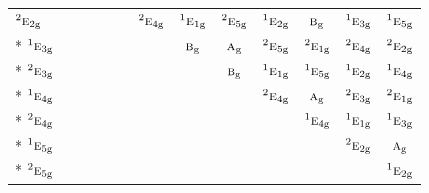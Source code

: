 \documentclass[10pt,a4paper]{article}
\numberwithin{equation}{section}
\newcommand{\irr}[1]{\text{\normalfont\scshape #1}}
\newcommand{\conjpair}[1]{{}^{#1}}
\newcommand{\ptag}[1]{\mathrm{#1}}
\begin{document}
{\begin{longtable}{@{}lcccccccccccc@{}}
$\conjpair{2}\irr{e}_{2\ptag{g}}$ &  &  &  &  &  & $\conjpair{2}\irr{e}_{4\ptag{g}}$ & $\conjpair{1}\irr{e}_{1\ptag{g}}$ & $\conjpair{2}\irr{e}_{5\ptag{g}}$ & $\conjpair{1}\irr{e}_{2\ptag{g}}$ & $\irr{b}_{\ptag{g}}$ & $\conjpair{1}\irr{e}_{3\ptag{g}}$ & $\conjpair{1}\irr{e}_{5\ptag{g}}$\\*
$\conjpair{1}\irr{e}_{3\ptag{g}}$ &  &  &  &  &  &  & $\irr{b}_{\ptag{g}}$ & $\irr{a}_{\ptag{g}}$ & $\conjpair{2}\irr{e}_{5\ptag{g}}$ & $\conjpair{2}\irr{e}_{1\ptag{g}}$ & $\conjpair{2}\irr{e}_{4\ptag{g}}$ & $\conjpair{2}\irr{e}_{2\ptag{g}}$\\*
$\conjpair{2}\irr{e}_{3\ptag{g}}$ &  &  &  &  &  &  &  & $\irr{b}_{\ptag{g}}$ & $\conjpair{1}\irr{e}_{1\ptag{g}}$ & $\conjpair{1}\irr{e}_{5\ptag{g}}$ & $\conjpair{1}\irr{e}_{2\ptag{g}}$ & $\conjpair{1}\irr{e}_{4\ptag{g}}$\\*
$\conjpair{1}\irr{e}_{4\ptag{g}}$ &  &  &  &  &  &  &  &  & $\conjpair{2}\irr{e}_{4\ptag{g}}$ & $\irr{a}_{\ptag{g}}$ & $\conjpair{2}\irr{e}_{3\ptag{g}}$ & $\conjpair{2}\irr{e}_{1\ptag{g}}$\\*
$\conjpair{2}\irr{e}_{4\ptag{g}}$ &  &  &  &  &  &  &  &  &  & $\conjpair{1}\irr{e}_{4\ptag{g}}$ & $\conjpair{1}\irr{e}_{1\ptag{g}}$ & $\conjpair{1}\irr{e}_{3\ptag{g}}$\\*
$\conjpair{1}\irr{e}_{5\ptag{g}}$ &  &  &  &  &  &  &  &  &  &  & $\conjpair{2}\irr{e}_{2\ptag{g}}$ & $\irr{a}_{\ptag{g}}$\\*
$\conjpair{2}\irr{e}_{5\ptag{g}}$ &  &  &  &  &  &  &  &  &  &  &  & $\conjpair{1}\irr{e}_{2\ptag{g}}$\\
\bottomrule\end{longtable}}
\end{document}
